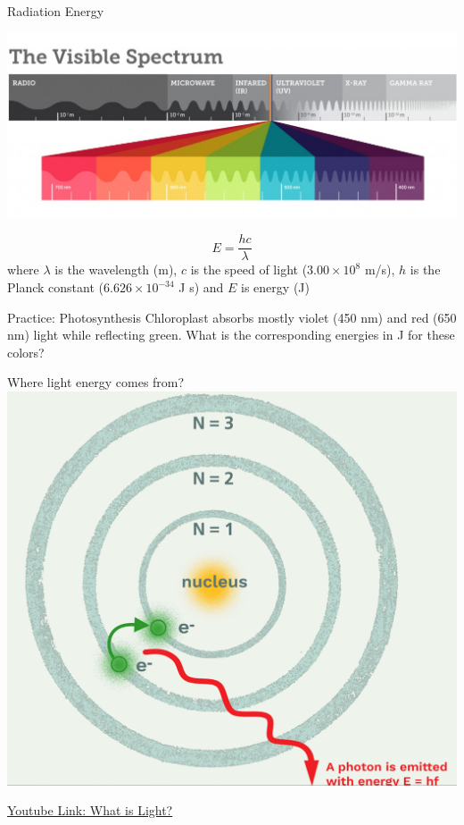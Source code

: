 \documentclass[11pt]{beamer}
\begin{document}
\begin{frame}{Radiation Energy}
  \begin{center}
    \includegraphics[width=0.85\linewidth]{visible_light}
  \end{center}
  \begin{equation}
    E = \frac{hc}{\lambda}
    \label{eqn:photon}
  \end{equation}
  where $\lambda$ is the wavelength (m), $c$ is the speed
  of light ($3.00 \times 10^8$ m/s), $h$ is the Planck constant
  ($6.626 \times 10^{-34}$ J s) and $E$ is energy (J)
\end{frame}

\begin{frame}{Practice: Photosynthesis}
  Chloroplast absorbs mostly violet (450 nm) and red (650 nm) light
  while reflecting green. What is the corresponding energies in J
  for these colors?
  \vspace{1.75in}
\end{frame}

\begin{frame}{Where light energy comes from?}
  \centering
  \includegraphics[width=0.55\linewidth]{bohr_model}
  
  \href{https://www.youtube.com/watch?v=IXxZRZxafEQ}{Youtube Link: What is Light?}
\end{frame}
\end{document}
